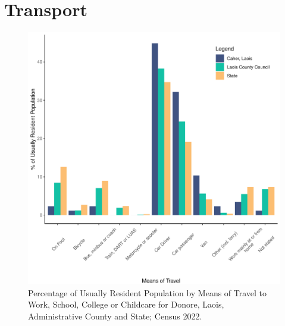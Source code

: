 \documentclass{article}
\begin{document}
\section{Transport}\label{sect:Trans}
\begin{figure}[H]
	\centering
	\includegraphics[width = 120mm]{../figures/TravelED.pdf}
	\caption{Percentage of Usually Resident Population by Means of Travel to Work, School, College or Childcare for Donore, Laois, Administrative County and State; Census 2022.}
	\label{fig:vbnv}
	\end{figure}
\end{document}

